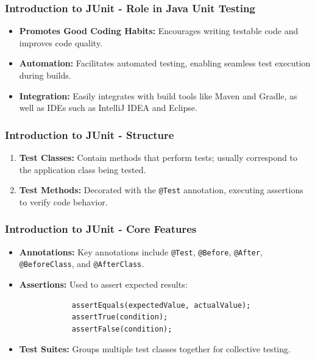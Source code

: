 \documentclass{beamer}
\begin{document}
\begin{frame}[fragile]
    \frametitle{Introduction to JUnit - Role in Java Unit Testing}
    \begin{itemize}
        \item \textbf{Promotes Good Coding Habits:} Encourages writing testable code and improves code quality.
        \item \textbf{Automation:} Facilitates automated testing, enabling seamless test execution during builds.
        \item \textbf{Integration:} Easily integrates with build tools like Maven and Gradle, as well as IDEs such as IntelliJ IDEA and Eclipse.
    \end{itemize}
\end{frame}

\begin{frame}[fragile]
    \frametitle{Introduction to JUnit - Structure}
    \begin{enumerate}
        \item \textbf{Test Classes:} Contain methods that perform tests; usually correspond to the application class being tested.
        \item \textbf{Test Methods:} Decorated with the \texttt{@Test} annotation, executing assertions to verify code behavior.
    \end{enumerate}
\end{frame}

\begin{frame}[fragile]
    \frametitle{Introduction to JUnit - Core Features}
    \begin{itemize}
        \item \textbf{Annotations:} Key annotations include \texttt{@Test}, \texttt{@Before}, \texttt{@After}, \texttt{@BeforeClass}, and \texttt{@AfterClass}.
        \item \textbf{Assertions:} Used to assert expected results:
            \begin{lstlisting}
            assertEquals(expectedValue, actualValue);
            assertTrue(condition);
            assertFalse(condition);
            \end{lstlisting}
        \item \textbf{Test Suites:} Groups multiple test classes together for collective testing.
    \end{itemize}
\end{frame}
\end{document}
